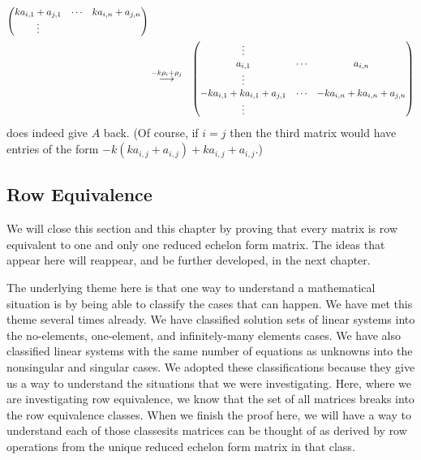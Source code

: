 \begin{exercises}
\begin{answer}
\begin{exparts}
\begin{eqnarray*}
\begin{pmatrix}
            ka_{i,1}+a_{j,1}  &\cdots  &ka_{i,n}+a_{j,n}  \\
            \vdots                     
          \end{pmatrix}                                        \\
          &\mathrel{ \mathop{\longrightarrow}\limits^{-k\rho_i+\rho_j\mathstrut}_{ \begin{subarray}{l} \relax \end{subarray}}}
          &\begin{pmatrix}
            \vdots                                      \\
            a_{i,1}           &\cdots  &a_{i,n}          \\
            \vdots                                      \\
            -ka_{i,1}+ka_{i,1}+a_{j,1}  &\cdots &-ka_{i,n}+ka_{i,n}+a_{j,n} \\
            \vdots                     
          \end{pmatrix}
        \end{eqnarray*}
        does indeed give $A$ back.
        (Of course, if $i=j$ then the third matrix would have entries of the 
        form $-k(ka_{i,j}+a_{i,j})+ka_{i,j}+a_{i,j}$.)
    \end{exparts}
   \end{answer}
\end{exercises}




















\subsection{Row Equivalence}
We will close this section and this chapter by proving 
that every matrix is row equivalent to one
and only one reduced echelon form matrix.
The ideas that appear here will reappear, and be further developed, in the
next chapter.

The underlying theme here is that one way to understand a
mathematical situation is by being able to classify the cases that can happen.
We have met this theme several times already.
We have classified solution sets of linear systems into the no-elements, 
one-element, and infinitely-many elements cases.
We have also classified linear systems with the same number of equations 
as unknowns into the nonsingular and singular cases.
We adopted these classifications because they give us a way to understand
the situations that we were investigating.
Here, where we are investigating row equivalence, we know that the set of all
matrices breaks into the row equivalence classes.
When we finish the proof here, we will have a way to understand each of those
classes\Dash its matrices can be thought of as derived by row operations from the
unique reduced echelon form matrix in that class.

